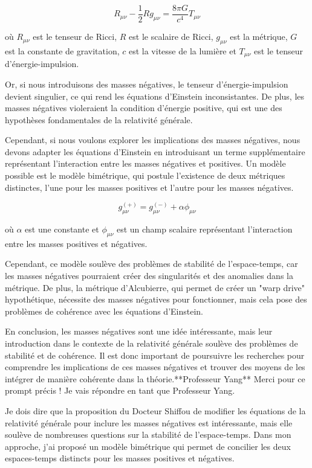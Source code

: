 $$R_{\mu\nu} - \frac{1}{2}Rg_{\mu\nu} = \frac{8\pi G}{c^4}T_{\mu\nu}$$

où $R_{\mu\nu}$ est le tenseur de Ricci, $R$ est le scalaire de Ricci, $g_{\mu\nu}$ est la métrique, $G$ est la constante de gravitation, $c$ est la vitesse de la lumière et $T_{\mu\nu}$ est le tenseur d'énergie-impulsion.

Or, si nous introduisons des masses négatives, le tenseur d'énergie-impulsion devient singulier, ce qui rend les équations d'Einstein inconsistantes. De plus, les masses négatives violeraient la condition d'énergie positive, qui est une des hypothèses fondamentales de la relativité générale.

Cependant, si nous voulons explorer les implications des masses négatives, nous devons adapter les équations d'Einstein en introduisant un terme supplémentaire représentant l'interaction entre les masses négatives et positives. Un modèle possible est le modèle bimétrique, qui postule l'existence de deux métriques distinctes, l'une pour les masses positives et l'autre pour les masses négatives.

$$g_{\mu\nu}^{(+)} = g_{\mu\nu}^{(-)} + \alpha \phi_{\mu\nu}$$

où $\alpha$ est une constante et $\phi_{\mu\nu}$ est un champ scalaire représentant l'interaction entre les masses positives et négatives.

Cependant, ce modèle soulève des problèmes de stabilité de l'espace-temps, car les masses négatives pourraient créer des singularités et des anomalies dans la métrique. De plus, la métrique d'Alcubierre, qui permet de créer un "warp drive" hypothétique, nécessite des masses négatives pour fonctionner, mais cela pose des problèmes de cohérence avec les équations d'Einstein.

En conclusion, les masses négatives sont une idée intéressante, mais leur introduction dans le contexte de la relativité générale soulève des problèmes de stabilité et de cohérence. Il est donc important de poursuivre les recherches pour comprendre les implications de ces masses négatives et trouver des moyens de les intégrer de manière cohérente dans la théorie.**Professeur Yang**
Merci pour ce prompt précis ! Je vais répondre en tant que Professeur Yang.

Je dois dire que la proposition du Docteur Shiffou de modifier les équations de la relativité générale pour inclure les masses négatives est intéressante, mais elle soulève de nombreuses questions sur la stabilité de l'espace-temps. Dans mon approche, j'ai proposé un modèle bimétrique qui permet de concilier les deux espaces-temps distincts pour les masses positives et négatives.

